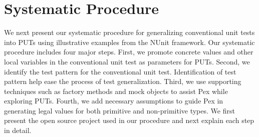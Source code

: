 \section{Systematic Procedure}
\label{sec:procedure}

We next present our systematic procedure for generalizing conventional unit tests into PUTs using illustrative examples from the NUnit framework. Our systematic procedure includes four major steps. First, we promote concrete values and other local variables in the conventional unit test as parameters for PUTs. Second, we identify the test pattern for the conventional unit test. Identification of test pattern help ease the process of test generalization. Third, we use supporting techniques such as factory methods and mock objects to assist Pex while exploring PUTs. Fourth, we add necessary assumptions to guide Pex in generating legal values for both primitive and non-primitive types. We first present the open source project used in our procedure and next explain each step in detail.

